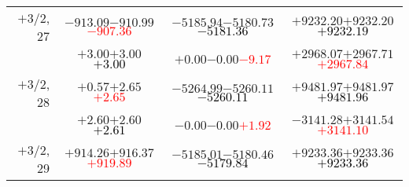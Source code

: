 \documentclass[compress]{beamer}
\begin{document}
\begin{frame}
{\begin{tabular}{r | c | c | c}
$+$3/2, 27 & $-913.09$\hspace{0.1 cm}$-910.99$\hspace{0.1 cm}\textcolor{red}{$-907.36$} & $-5185.94$\hspace{0.1 cm}$-5180.73$\hspace{0.1 cm}\textcolor{black}{$-5181.36$} & $+9232.20$\hspace{0.1 cm}$+9232.20$\hspace{0.1 cm}\textcolor{black}{$+9232.19$} \\
           & $+3.00$\hspace{0.1 cm}$+3.00$\hspace{0.1 cm}\textcolor{black}{$+3.00$} & $+0.00$\hspace{0.1 cm}$-0.00$\hspace{0.1 cm}\textcolor{red}{$-9.17$} & $+2968.07$\hspace{0.1 cm}$+2967.71$\hspace{0.1 cm}\textcolor{red}{$+2967.84$} \\
$+$3/2, 28 & $+0.57$\hspace{0.1 cm}$+2.65$\hspace{0.1 cm}\textcolor{red}{$+2.65$} & $-5264.99$\hspace{0.1 cm}$-5260.11$\hspace{0.1 cm}\textcolor{black}{$-5260.11$} & $+9481.97$\hspace{0.1 cm}$+9481.97$\hspace{0.1 cm}\textcolor{black}{$+9481.96$} \\
           & $+2.60$\hspace{0.1 cm}$+2.60$\hspace{0.1 cm}\textcolor{black}{$+2.61$} & $-0.00$\hspace{0.1 cm}$-0.00$\hspace{0.1 cm}\textcolor{red}{$+1.92$} & $-3141.28$\hspace{0.1 cm}$+3141.54$\hspace{0.1 cm}\textcolor{red}{$+3141.10$} \\
$+$3/2, 29 & $+914.26$\hspace{0.1 cm}$+916.37$\hspace{0.1 cm}\textcolor{red}{$+919.89$} & $-5185.01$\hspace{0.1 cm}$-5180.46$\hspace{0.1 cm}\textcolor{black}{$-5179.84$} & $+9233.36$\hspace{0.1 cm}$+9233.36$\hspace{0.1 cm}\textcolor{black}{$+9233.36$} \\

\end{tabular}}
\end{frame}
\end{document}
